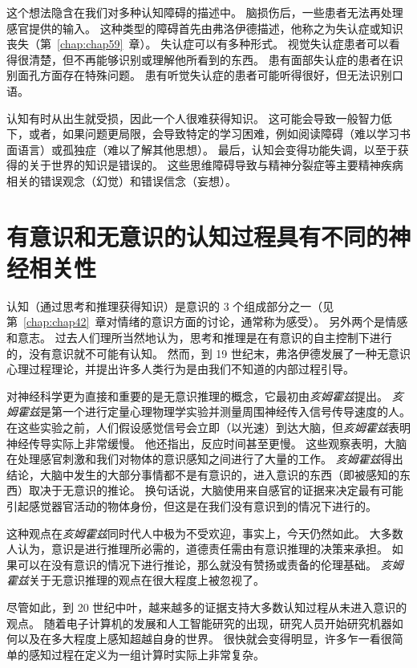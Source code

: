 这个想法隐含在我们对多种认知障碍的描述中。
脑损伤后，一些患者无法再处理感官提供的输入。
这种类型的障碍首先由弗洛伊德描述，他称之为失认症或知识丧失（第~\ref{chap:chap59}~章）。
失认症可以有多种形式。
视觉失认症患者可以看得很清楚，但不再能够识别或理解他所看到的东西。
患有面部失认症的患者在识别面孔方面存在特殊问题。
患有听觉失认症的患者可能听得很好，但无法识别口语。


认知有时从出生就受损，因此一个人很难获得知识。
这可能会导致一般智力低下，或者，如果问题更局限，会导致特定的学习困难，例如阅读障碍（难以学习书面语言）或孤独症（难以了解其他思想）。
最后，认知会变得功能失调，以至于获得的关于世界的知识是错误的。
这些思维障碍导致与精神分裂症等主要精神疾病相关的错误观念（幻觉）和错误信念（妄想）。



\section{有意识和无意识的认知过程具有不同的神经相关性}

认知（通过思考和推理获得知识）是意识的 3 个组成部分之一（见第~\ref{chap:chap42}~章对情绪的意识方面的讨论，通常称为感受）。
另外两个是情感和意志。
过去人们理所当然地认为，思考和推理是在有意识的自主控制下进行的，没有意识就不可能有认知。
然而，到 19 世纪末，弗洛伊德发展了一种无意识心理过程理论，并提出许多人类行为是由我们不知道的内部过程引导。


对神经科学更为直接和重要的是无意识推理的概念，它最初由\textit{亥姆霍兹}提出。
\textit{亥姆霍兹}是第一个进行定量心理物理学实验并测量周围神经传入信号传导速度的人。
在这些实验之前，人们假设感觉信号会立即（以光速）到达大脑，但\textit{亥姆霍兹}表明神经传导实际上非常缓慢。
他还指出，反应时间甚至更慢。
这些观察表明，大脑在处理感官刺激和我们对物体的意识感知之间进行了大量的工作。
\textit{亥姆霍兹}得出结论，大脑中发生的大部分事情都不是有意识的，进入意识的东西（即被感知的东西）取决于无意识的推论。
换句话说，大脑使用来自感官的证据来决定最有可能引起感觉器官活动的物体身份，但这是在我们没有意识到的情况下进行的。


这种观点在\textit{亥姆霍兹}同时代人中极为不受欢迎，事实上，今天仍然如此。
大多数人认为，意识是进行推理所必需的，道德责任需由有意识推理的决策来承担。
如果可以在没有意识的情况下进行推论，那么就没有赞扬或责备的伦理基础。
\textit{亥姆霍兹}关于无意识推理的观点在很大程度上被忽视了。



尽管如此，到 20 世纪中叶，越来越多的证据支持大多数认知过程从未进入意识的观点。
随着电子计算机的发展和人工智能研究的出现，研究人员开始研究机器如何以及在多大程度上感知超越自身的世界。
很快就会变得明显，许多乍一看很简单的感知过程在定义为一组计算时实际上非常复杂。


